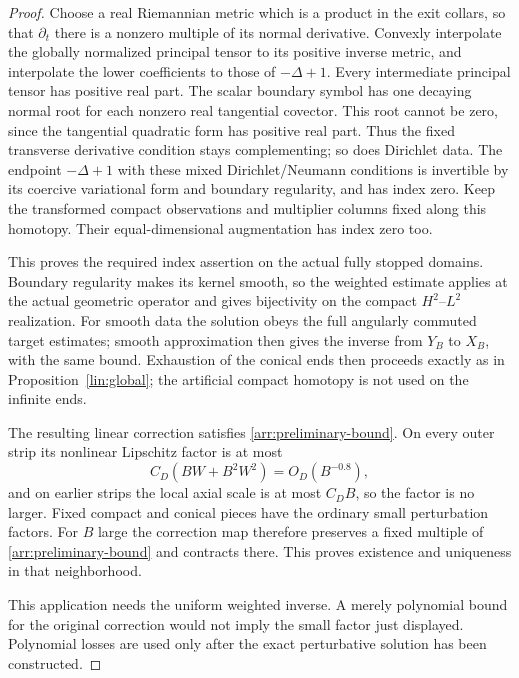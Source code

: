 \begin{proof}
Choose a real Riemannian metric which is a product in the exit
collars, so that $\partial_t$ there is a nonzero multiple of its
normal derivative. Convexly interpolate the globally normalized
principal tensor to its positive inverse metric, and interpolate
the lower coefficients to those of $-\Delta+1$. Every intermediate
principal tensor has positive real part. The scalar boundary
symbol has one decaying normal root for each nonzero real
tangential covector. This root cannot be zero, since the
tangential quadratic form has positive real part. Thus the fixed
transverse derivative condition stays complementing; so does
Dirichlet data. The endpoint $-\Delta+1$ with these mixed
Dirichlet/Neumann conditions is invertible by its coercive variational
form and boundary regularity, and has index zero.
Keep the transformed compact observations and multiplier
columns fixed along this homotopy. Their equal-dimensional
augmentation has index zero too.

This proves the required index assertion on the actual fully
stopped domains. Boundary regularity makes its kernel smooth, so
the weighted estimate applies at the actual geometric operator and
gives bijectivity on the compact $H^2$--$L^2$ realization.
For smooth data the solution obeys the full angularly commuted
target estimates; smooth approximation then gives the inverse
from $Y_B$ to $X_B$, with the same bound. Exhaustion of the
conical ends then proceeds exactly as in Proposition~\ref{lin:global};
the artificial compact homotopy is not used on the infinite ends.

The resulting linear correction satisfies
\eqref{arr:preliminary-bound}.  On every outer strip its
nonlinear Lipschitz factor is at most
\[
 C_D(BW+B^2W^2)=O_D(B^{-0.8}),
\]
and on earlier strips the local axial scale is at most \(C_DB\),
so the factor is no larger.  Fixed compact and conical pieces
have the ordinary small perturbation factors.  For \(B\) large
the correction map therefore preserves a fixed multiple of
\eqref{arr:preliminary-bound} and contracts there.
This proves existence and uniqueness in that neighborhood.

This application needs the uniform weighted inverse.  A merely
polynomial bound for the original correction would not imply
the small factor just displayed.  Polynomial losses are used
only after the exact perturbative solution has been constructed.


\end{proof}
